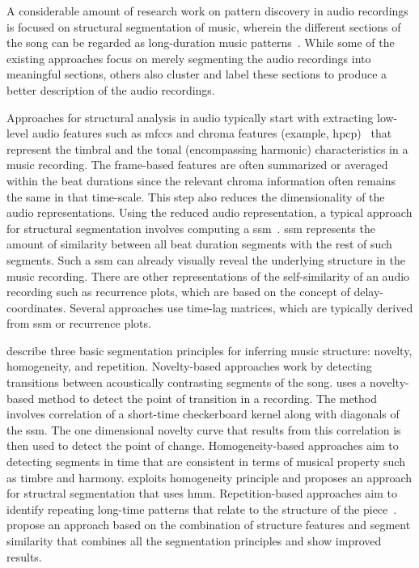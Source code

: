 A considerable amount of research work on pattern discovery in audio recordings is focused on structural segmentation of music, wherein the different sections of the song can be regarded as long-duration music patterns~\citep{paulus2010state}. While some of the existing approaches focus on merely segmenting the audio recordings into meaningful sections, others also cluster and label these sections to produce a better description of the audio recordings. 

Approaches for structural analysis in audio typically start with extracting low-level audio features such as \glspl{mfcc} and chroma features (example, \gls{hpcp})~\citep{gomez2006tonal} that represent the timbral and the tonal (encompassing harmonic) characteristics in a music recording. The frame-based features are often summarized or averaged within the beat durations since the relevant chroma information often remains the same in that time-scale. This step also reduces the dimensionality of the audio representations. Using the reduced audio representation, a typical approach for structural segmentation involves computing a \gls{ssm}~\citep{foote2000automatic}. \Gls{ssm} represents the amount of similarity between all beat duration segments with the rest of such segments. Such a \gls{ssm} can already visually reveal the underlying structure in the music recording. There are other representations of the self-similarity of an audio recording such as recurrence plots, which are based on the concept of delay-coordinates. Several approaches use time-lag matrices, which are typically derived from \gls{ssm} or recurrence plots.

\cite{paulus2010state} describe three basic segmentation principles for inferring music structure: novelty, homogeneity, and repetition. Novelty-based approaches work by detecting transitions between acoustically contrasting segments of the song. \cite{foote2000automatic} uses a novelty-based method to detect the point of transition in a recording. The method involves correlation of a short-time checkerboard kernel along with diagonals of the \gls{ssm}. The one dimensional novelty curve that results from this correlation is then used to detect the point of change. Homogeneity-based approaches aim to detecting segments in time that are consistent in terms of musical property such as timbre and harmony. \cite{Levy08TASLP} exploits homogeneity principle and proposes an approach for structral segmentation that uses \acrfull{hmm}. Repetition-based approaches aim to identify repeating long-time patterns that relate to the structure of the piece~\cite{Goto06TASLP,dannenberg2003pattern,muller2006towards}.  \cite{serra2014unsupervised} propose an approach based on the combination of structure features and segment similarity that combines all the segmentation principles and show improved results.  

